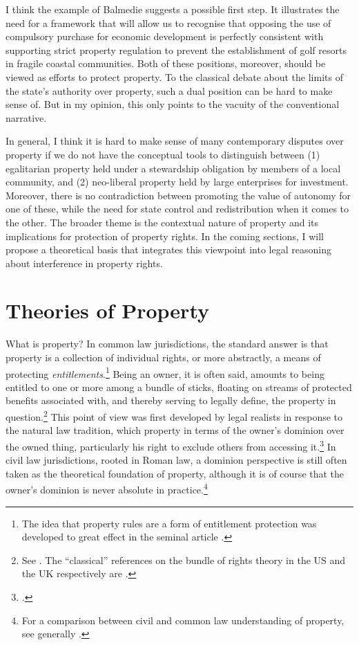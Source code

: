 I think the example of Balmedie suggests a possible first step. It illustrates the need for a framework that will allow us to recognise that opposing the use of compulsory purchase for economic development is perfectly consistent with supporting strict property regulation to prevent the establishment of golf resorts in fragile coastal communities. Both of these positions, moreover, should be viewed as efforts to protect property. To the classical debate about the limits of the state's authority over property, such a dual position can be hard to make sense of. But in my opinion, this only points to the vacuity of the conventional narrative.

In general, I think it is hard to make sense of many contemporary disputes over property if we do not have the conceptual tools to distinguish between (1) egalitarian property held under a stewardship obligation by members of a local community, and (2) neo-liberal property held by large enterprises for investment. Moreover, there is no contradiction between promoting the value of autonomy for one of these, while  the need for state control and redistribution when it comes to the other. The broader theme is the contextual nature of property and its implications for protection of property rights. In the coming sections, I will propose a theoretical basis that integrates this viewpoint into legal reasoning about interference in property rights.

\section{Theories of Property}\label{sec:2:3}

What is property? In common law jurisdictions, the standard answer is that property is a collection of individual rights, or more abstractly, a means of protecting {\it entitlements}.\footnote{The idea that property rules are a form of entitlement protection was developed to great effect in the seminal article \cite{calabresi72}.} Being an owner, it is often said, amounts to being entitled to one or more among a bundle of sticks, floating on streams of protected benefits associated with, and thereby serving to legally define, the property in question.\footnote{See \cite[357-358]{merrill01}. The ``classical'' references on the bundle of rights theory in the US and the UK respectively are \cite{hohfeld17,honore61}.} This point of view was first developed by legal realists in response to the natural law tradition, which  property in terms of the owner's dominion over the owned thing, particularly his right to exclude others from accessing it.\footcite[193-195]{klein11} In civil law jurisdictions, rooted in Roman law, a dominion perspective is still often taken as the theoretical foundation of property, although it is of course  that the owner's dominion is never absolute in practice.\footnote{For a comparison between civil and common law understanding of property, see generally \cite{chang12}.}

